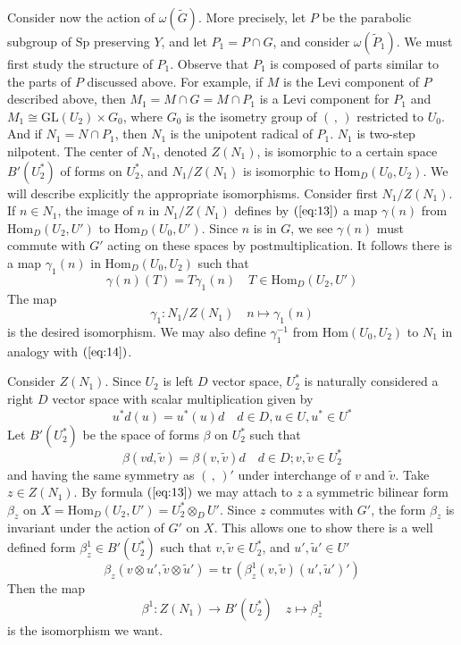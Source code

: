 \documentclass[12pt]{amsart}
\def\Sp{{\mathrm{Sp}}}
\def\GL{{\mathrm{GL}}}
\def\Hom{{\mathrm{Hom}}}
\def\tP{{\widetilde{P}}}
\def\tG{{\widetilde{G}}}
\def\tv{{\widetilde{v}}}
\def\tu{{\widetilde{u}}}
\def\tr{{\mathrm{tr\,}}}
\begin{document}
Consider now the action of $\omega(\tG)$. More precisely, let $P$ 
be the parabolic subgroup of $\Sp$ preserving $Y$, 
and let $P_1=P\cap G$, and consider $\omega(\tP_1)$. 
We must first study the structure of $P_1$. Observe that $P_1$ is composed 
of parts similar to the parts of $P$ discussed above. 
For example, if $M$ is the Levi component of $P$ described above, then 
$M_1=M\cap G=M\cap P_1$ is a Levi component for $P_1$ and 
$M_1 \cong \GL(U_2)\times G_0$, where $G_0$ is the isometry group
of $(\,,\,)$ restricted to $U_0$. And if $N_1 = N\cap P_1$, then 
$N_1$ is the unipotent radical of $P_1$. $N_1$ is two-step nilpotent. 
The center of $N_1$, denoted $Z(N_1)$, is isomorphic to 
a certain space $B'(U_2^*)$ of forms on $U_2^*$, and 
$N_1/Z(N_1)$ is isomorphic to $\Hom_D(U_0,U_2)$. We will describe explicitly 
the appropriate isomorphisms.
Consider first $N_1/Z(N_1)$. If $n\in N_1$, the image of $n$ in $N_1/Z(N_1)$
defines by $(\ref{eq:13})$ a map $\gamma(n)$ from $\Hom_D(U_2,U')$ 
to $\Hom_D(U_0,U')$. Since $n$ is in $G$, we see $\gamma(n)$ must 
commute with $G'$ acting on these spaces by postmultiplication. 
It follows there is a map $\gamma_1(n)$ in $\Hom_D(U_0,U_2)$
such that 
\begin{equation}\label{eq:28}
  \gamma(n)(T) = T\gamma_1(n) \quad T\in \Hom_D(U_2,U')
\end{equation}
The map 
\[
\gamma_1 \colon N_1/Z(N_1) \quad n \mapsto \gamma_1(n)
\]
is the desired isomorphism. We may also define $\gamma_1^{-1}$ from 
$\Hom(U_0,U_2)$ to $N_1$ in analogy with $(\ref{eq:14})$.

Consider $Z(N_1)$. Since $U_2$ is left $D$ vector space, 
$U_2^*$ is naturally considered a right $D$ vector space with
scalar multiplication given by 
\[
u^*d(u) = u^*(u) d \quad d\in D, u\in U, u^*\in U^*
\]
Let $B'(U_2^*)$ be the space of forms $\beta$ on $U_2^*$ such that
\[
\beta(vd,\widetilde{v}) = \beta(v,\widetilde{v}) d
\quad d\in D; v,\widetilde{v}\in U_2^*
\]
and having the same symmetry as $(\,,\,)'$ under interchange of $v$ 
and $\widetilde{v}$.
Take $z\in Z(N_1)$. By formula $(\ref{eq:13})$ we may attach 
to $z$ a symmetric bilinear form $\beta_z$ on 
$X=\Hom_D(U_2,U')=U_2^*\otimes_DU'$. Since $z$ commutes with $G'$, 
the form $\beta_z$ is invariant under the action of $G'$ on $X$. 
This allows one to show there is a well defined form $\beta_z^1\in B'(U_2^*)$
such that $v,\tv\in U_2^*$, and $u', \tu'\in U'$
\[
\beta_z(v\otimes u', \tv\otimes\tu') = \tr(\beta_z^1(v,\tv)(u',\tu')')
\]
Then the map 
\begin{equation}\label{eq:29}
\beta^1\colon Z(N_1)\to B'(U_2^*) \quad z\mapsto \beta_z^1
\end{equation}
is the isomorphism we want. 
\end{document}
